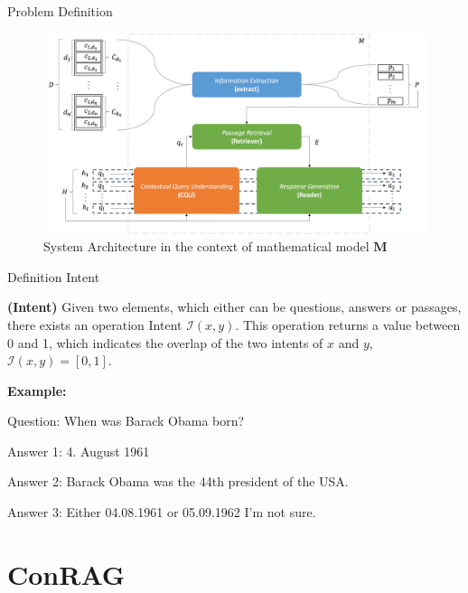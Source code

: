 \documentclass{beamer}
\begin{document}
\begin{frame}{Problem Definition}

  \begin{figure}
    \includegraphics[width=\textwidth]{Grafiken/conrag_konzeptionell.png}
    \caption{System Architecture in the context of mathematical model $\mathbf{M}$}
  \end{figure}
  
\end{frame}

\begin{frame}{Definition Intent}
  
  \begin{definition}
    \textbf{(Intent)} Given two elements, which either can be questions, answers or passages, there exists an operation Intent $\mathcal{I}(x, y)$. This operation returns a value between 0 and 1, which indicates the overlap of the two intents of $x$ and $y$, $\mathcal{I}(x, y) = [0,1]$.
    \label{def:intent}
  \end{definition}

  \bigskip
  \textbf{Example:}
  \begin{flushleft}
    Question: When was Barack Obama born?
  \end{flushleft}
  \begin{flushleft}
    Answer 1: 4. August 1961

    Answer 2: Barack Obama was the 44th president of the USA.
    
    Answer 3: Either 04.08.1961 or 05.09.1962 I'm not sure. 
  \end{flushleft}

\end{frame}

\section[ConRAG]{ConRAG}
\end{document}

